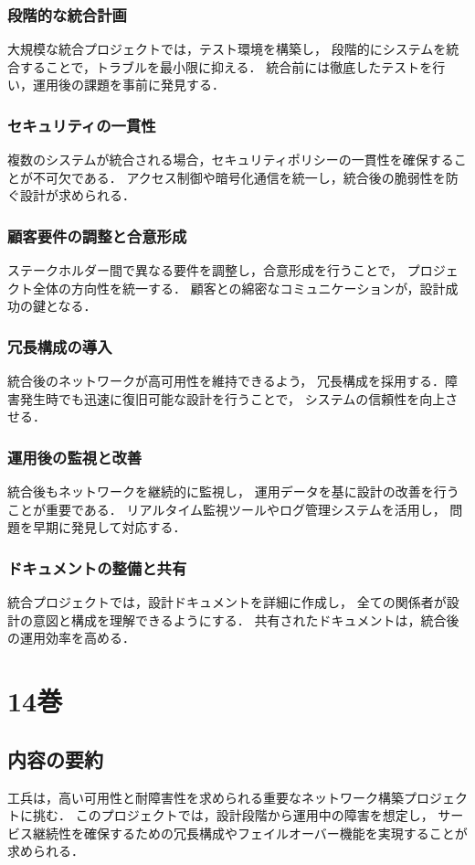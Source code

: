 \documentclass[titlepage,a4paper]{jsarticle}
\begin{document}
\subsubsection{段階的な統合計画}
大規模な統合プロジェクトでは，テスト環境を構築し，
段階的にシステムを統合することで，トラブルを最小限に抑える．
統合前には徹底したテストを行い，運用後の課題を事前に発見する．

\subsubsection{セキュリティの一貫性}
複数のシステムが統合される場合，セキュリティポリシーの一貫性を確保することが不可欠である．
アクセス制御や暗号化通信を統一し，統合後の脆弱性を防ぐ設計が求められる．

\subsubsection{顧客要件の調整と合意形成}
ステークホルダー間で異なる要件を調整し，合意形成を行うことで，
プロジェクト全体の方向性を統一する．
顧客との綿密なコミュニケーションが，設計成功の鍵となる．

\subsubsection{冗長構成の導入}
統合後のネットワークが高可用性を維持できるよう，
冗長構成を採用する．障害発生時でも迅速に復旧可能な設計を行うことで，
システムの信頼性を向上させる．

\subsubsection{運用後の監視と改善}
統合後もネットワークを継続的に監視し，
運用データを基に設計の改善を行うことが重要である．
リアルタイム監視ツールやログ管理システムを活用し，
問題を早期に発見して対応する．

\subsubsection{ドキュメントの整備と共有}
統合プロジェクトでは，設計ドキュメントを詳細に作成し，
全ての関係者が設計の意図と構成を理解できるようにする．
共有されたドキュメントは，統合後の運用効率を高める．

\newpage
\section{14巻}
\subsection{内容の要約}
工兵は，高い可用性と耐障害性を求められる重要なネットワーク構築プロジェクトに挑む．
このプロジェクトでは，設計段階から運用中の障害を想定し，
サービス継続性を確保するための冗長構成やフェイルオーバー機能を実現することが求められる．
\end{document}
